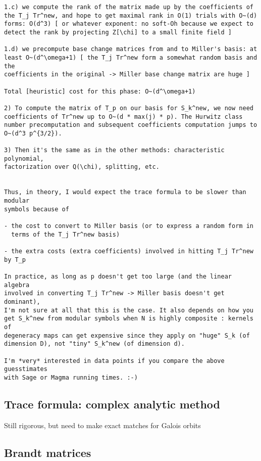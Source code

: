 \documentclass[11pt]{amsart}
\numberwithin{equation}{subsection}
\theoremstyle{plain}
\theoremstyle{definition}
\begin{document}
\begin{verbatim}
1.c) we compute the rank of the matrix made up by the coefficients of
the T_j Tr^new, and hope to get maximal rank in O(1) trials with O~(d)
forms: O(d^3) [ or whatever exponent: no soft-Oh because we expect to
detect the rank by projecting Z[\chi] to a small finite field ]

1.d) we precompute base change matrices from and to Miller's basis: at
least O~(d^\omega+1) [ the T_j Tr^new form a somewhat random basis and the
coefficients in the original -> Miller base change matrix are huge ]

Total [heuristic] cost for this phase: O~(d^\omega+1)

2) To compute the matrix of T_p on our basis for S_k^new, we now need
coefficients of Tr^new up to O~(d * max(j) * p). The Hurwitz class
number precomputation and subsequent coefficients computation jumps to
O~(d^3 p^{3/2}).

3) Then it's the same as in the other methods: characteristic polynomial,
factorization over Q(\chi), splitting, etc.


Thus, in theory, I would expect the trace formula to be slower than modular
symbols because of

- the cost to convert to Miller basis (or to express a random form in
  terms of the T_j Tr^new basis)

- the extra costs (extra coefficients) involved in hitting T_j Tr^new by T_p

In practice, as long as p doesn't get too large (and the linear algebra
involved in converting T_j Tr^new -> Miller basis doesn't get dominant),
I'm not sure at all that this is the case. It also depends on how you
get S_k^new from modular symbols when N is highly composite : kernels of
degeneracy maps can get expensive since they apply on "huge" S_k (of
dimension D), not "tiny" S_k^new (of dimension d).

I'm *very* interested in data points if you compare the above guesstimates
with Sage or Magma running times. :-)
\end{verbatim}

\subsection{Trace formula: complex analytic method}

Still rigorous, but need to make exact matches for Galois orbits

\subsection{Brandt matrices}
\end{document}
